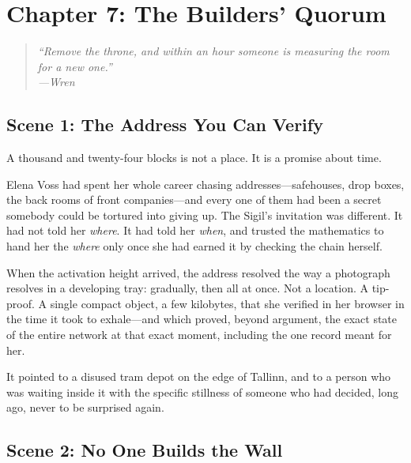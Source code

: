 \documentclass[12pt,letterpaper]{book}
\begin{document}
\hypertarget{chapter-7-the-builders-quorum}{%
\section{Chapter 7: The Builders'
Quorum}\label{chapter-7-the-builders-quorum}}

\begin{quote}
\itshape ``Remove the throne, and within an hour someone is measuring the room
for a new one.''\\
\normalfont\hfill---Wren
\end{quote}

\hypertarget{scene-1-the-address-you-can-verify}{%
\subsection{Scene 1: The Address You Can
Verify}\label{scene-1-the-address-you-can-verify}}

A thousand and twenty-four blocks is not a place. It is a promise about time.

Elena Voss had spent her whole career chasing addresses---safehouses, drop
boxes, the back rooms of front companies---and every one of them had been a
secret somebody could be tortured into giving up. The Sigil's invitation was
different. It had not told her \emph{where}. It had told her \emph{when}, and
trusted the mathematics to hand her the \emph{where} only once she had earned
it by checking the chain herself.

When the activation height arrived, the address resolved the way a photograph
resolves in a developing tray: gradually, then all at once. Not a location. A
tip-proof. A single compact object, a few kilobytes, that she verified in her
browser in the time it took to exhale---and which proved, beyond argument, the
exact state of the entire network at that exact moment, including the one
record meant for her.

It pointed to a disused tram depot on the edge of Tallinn, and to a person who
was waiting inside it with the specific stillness of someone who had decided,
long ago, never to be surprised again.

\hypertarget{scene-2-no-one-builds-the-wall}{%
\subsection{Scene 2: No One Builds the
Wall}\label{scene-2-no-one-builds-the-wall}}
\end{document}
